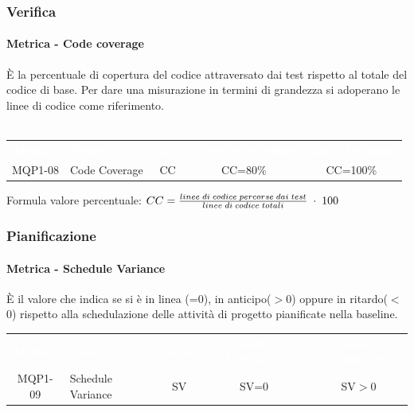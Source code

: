     \subsubsection{Verifica}
        \paragraph{Metrica - Code coverage}
        È la percentuale di copertura del codice attraversato dai test rispetto al totale del codice di base. Per dare una misurazione in termini di grandezza si adoperano le linee di codice come riferimento.
        \\ \\ %
        \renewcommand{\arraystretch}{1.5}
        \begin{longtable}{ c C{4cm} c c c}
        \textcolor{white}{\textbf{Metrica}} & \textcolor{white}{\textbf{Nome}} & \textcolor{white}{\textbf{Sigla}} & \textcolor{white}{\textbf{Valore Accettabile}} & \textcolor{white}{\textbf{Valore Ottimale}}\\
        MQP1-08 & Code Coverage & CC & CC=80\%  & CC=100\%  \\	     
        \end{longtable}
        Formula valore percentuale: \begin{math}{CC = {linee \; di \; codice \; percorse \; dai  \; test \over linee \; di \; codice \; totali} \; \cdot \; 100}\end{math}

    \subsubsection{Pianificazione}
        \paragraph{Metrica - Schedule Variance}
        È il valore che indica se si è in linea (=0), in anticipo($>$0) oppure in ritardo($<$0) rispetto alla schedulazione delle attività di progetto pianificate nella baseline.

        \renewcommand{\arraystretch}{1.5}
        \begin{longtable}{ c C{4cm} c c c}
        \textcolor{white}{\textbf{Metrica}} & \textcolor{white}{\textbf{Nome}} & \textcolor{white}{\textbf{Sigla}} & \textcolor{white}{\textbf{Valore Accettabile}} & \textcolor{white}{\textbf{Valore Ottimale}}\\
        MQP1-09 & Schedule Variance & SV & SV=0  & SV$>$0  \\	     
        \end{longtable}

